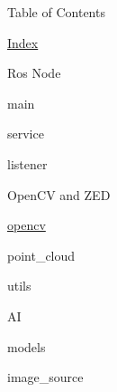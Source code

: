 \begin{DoxyParagraph}{Table of Contents}

\end{DoxyParagraph}

\begin{DoxyItemize}
\item \mbox{\hyperlink{toc}{Index}}
\begin{DoxyItemize}
\item Ros Node
\begin{DoxyItemize}
\item main
\item service
\item listener
\end{DoxyItemize}
\item Open\+CV and Z\+ED
\begin{DoxyItemize}
\item \mbox{\hyperlink{namespaceopencv}{opencv}}
\item point\+\_\+cloud
\item utils
\end{DoxyItemize}
\item AI
\begin{DoxyItemize}
\item models
\item image\+\_\+source ~\newline
 
\end{DoxyItemize}
\end{DoxyItemize}
\end{DoxyItemize}